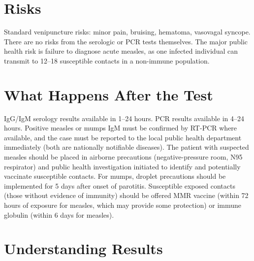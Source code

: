 \section*{Risks}
Standard venipuncture risks: minor pain, bruising, hematoma, vasovagal syncope. There are no risks from the serologic or PCR tests themselves. The major public health risk is failure to diagnose acute measles, as one infected individual can transmit to 12--18 susceptible contacts in a non-immune population.

\section*{What Happens After the Test}
IgG/IgM serology results available in 1--24 hours. PCR results available in 4--24 hours. Positive measles or mumps IgM must be confirmed by RT-PCR where available, and the case must be reported to the local public health department immediately (both are nationally notifiable diseases). The patient with suspected measles should be placed in airborne precautions (negative-pressure room, N95 respirator) and public health investigation initiated to identify and potentially vaccinate susceptible contacts. For mumps, droplet precautions should be implemented for 5 days after onset of parotitis. Susceptible exposed contacts (those without evidence of immunity) should be offered MMR vaccine (within 72 hours of exposure for measles, which may provide some protection) or immune globulin (within 6 days for measles).

\section*{Understanding Results}

